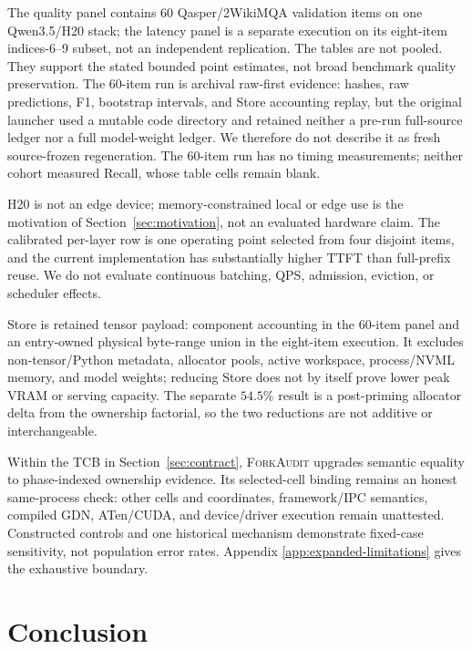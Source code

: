 \documentclass{article}
\newcommand{\method}{\textsc{ForkAudit}}
\begin{document}
The quality panel contains 60 Qasper/2WikiMQA validation items on one
Qwen3.5/H20 stack; the latency panel is a separate execution on its eight-item
indices-6--9 subset, not an independent replication.  The tables are not
pooled.  They support the stated bounded point estimates, not broad benchmark
quality preservation.  The
60-item run is archival raw-first evidence: hashes, raw predictions, F1,
bootstrap intervals, and Store accounting replay, but the original launcher
used a mutable code directory and retained neither a pre-run full-source ledger
nor a full model-weight ledger.  We therefore do not describe it as fresh
source-frozen regeneration.  The 60-item run has no timing measurements; neither
cohort measured Recall, whose table cells remain blank.

H20 is not an edge device; memory-constrained local or edge use is the
motivation of Section~\ref{sec:motivation}, not an evaluated hardware claim.
The calibrated per-layer row is
one operating point selected from four disjoint items, and the current
implementation has substantially higher TTFT than full-prefix reuse.  We do
not evaluate continuous batching, QPS, admission, eviction, or scheduler
effects.

Store is retained tensor payload: component accounting in the 60-item panel and
an entry-owned physical byte-range union in the eight-item execution.  It
excludes non-tensor/Python metadata, allocator pools, active workspace,
process/NVML memory, and model weights; reducing Store does not by itself prove lower peak VRAM or
serving capacity.  The separate
$54.5\%$ result is a post-priming allocator delta from the ownership factorial,
so the two reductions are not additive or interchangeable.

Within the TCB in Section~\ref{sec:contract}, \method{} upgrades semantic
equality to phase-indexed ownership evidence.  Its selected-cell binding remains
an honest same-process check: other cells and coordinates, framework/IPC
semantics, compiled GDN, ATen/CUDA, and device/driver execution remain
unattested.  Constructed controls and one historical mechanism demonstrate
fixed-case sensitivity, not population error rates.  Appendix
\ref{app:expanded-limitations} gives the exhaustive boundary.

\FloatBarrier

\section{Conclusion}
\end{document}
